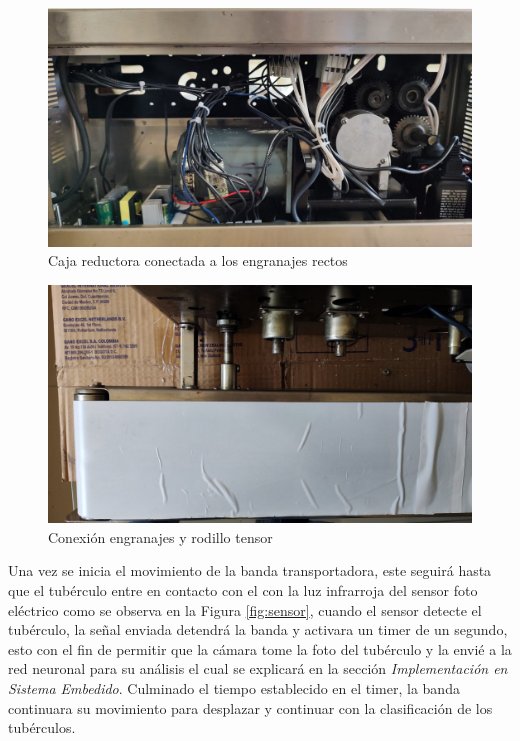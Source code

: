 		\begin{figure}[ht]
			\centering
			\includegraphics[scale=0.13]{Figs/201.jpg}
			\caption{Caja reductora conectada a los engranajes rectos}
			\label{fig:caja}
		\end{figure}
	
		
		\begin{figure}[ht]
			\centering
			\includegraphics[angle=270, scale=0.21]{Figs/202.jpg}
			\caption{Conexión engranajes y rodillo tensor}
			\label{fig:eje}
		\end{figure}

\newpage	
		Una vez se inicia el movimiento de la banda transportadora, este seguirá hasta que el tubérculo entre en contacto con el con la luz infrarroja del sensor foto eléctrico como se observa en la Figura \ref{fig:sensor}, cuando el sensor detecte el tubérculo, la señal enviada detendrá la banda y activara un timer de un segundo, esto con el fin de permitir que la cámara tome la foto del tubérculo y la envié a la red neuronal para su análisis el cual se explicará en la sección \textit{Implementación en Sistema Embedido}. Culminado el tiempo establecido en el timer, la banda continuara su movimiento para desplazar y continuar con la clasificación de los tubérculos.
		
